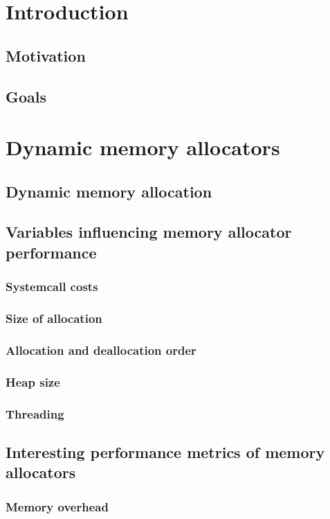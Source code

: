 
\chapter{Introduction}
\section{Motivation}
\section{Goals}
\chapter{Dynamic memory allocators}
\section{Dynamic memory allocation}
\section{Variables influencing memory allocator performance}
\subsection{Systemcall costs}
\subsection{Size of allocation}
\subsection{Allocation and deallocation order}
\subsection{Heap size}
\subsection{Threading}
\section{Interesting performance metrics of memory allocators}
\subsection{Memory overhead}
